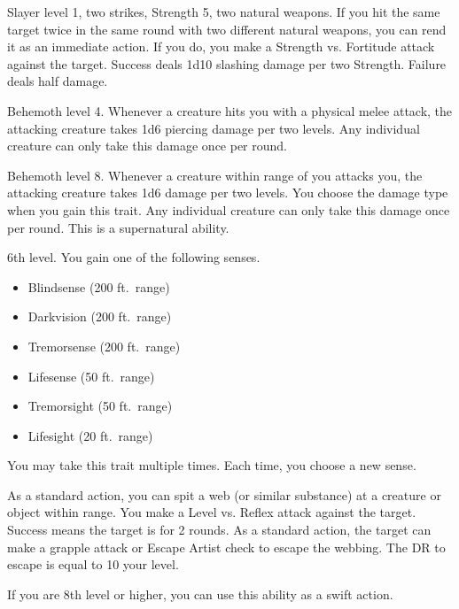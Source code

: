     \featpres Slayer level 1, two strikes, Strength 5, two natural weapons.
    \featben If you hit the same target twice in the same round with two different natural weapons, you can rend it as an immediate action.
    If you do, you make a Strength vs. Fortitude attack against the target.
    Success deals 1d10 slashing damage per two Strength.
    Failure deals half damage.

    \featpre Behemoth level 4.
    \featben Whenever a creature hits you with a physical melee attack, the attacking creature takes 1d6 piercing damage per two levels.
    Any individual creature can only take this damage once per round.

    \featpre Behemoth level 8.
    \featben Whenever a creature within \rngmed range of you attacks you, the attacking creature takes 1d6 damage per two levels.
    You choose the damage type when you gain this trait.
    Any individual creature can only take this damage once per round.
    This is a supernatural ability.

    \featpre 6th level.
    \featben You gain one of the following senses.
    \begin{itemize}
        \item Blindsense (200 ft.\ range)
        \item Darkvision (200 ft.\ range)
        \item Tremorsense (200 ft.\ range)
        \item Lifesense (50 ft.\ range)
        \item Tremorsight (50 ft.\ range)
        \item Lifesight (20 ft.\ range)
    \end{itemize}
     You may take this trait multiple times.
    Each time, you choose a new sense.

    \featben As a standard action, you can spit a web (or similar substance) at a creature or object within \rngmed range.
    You make a Level vs. Reflex attack against the target.
    Success means the target is \immobilized for 2 rounds.
    As a standard action, the target can make a grapple attack or Escape Artist check to escape the webbing.
    The DR to escape is equal to 10 \add your level.

    If you are 8th level or higher, you can use this ability as a swift action.

